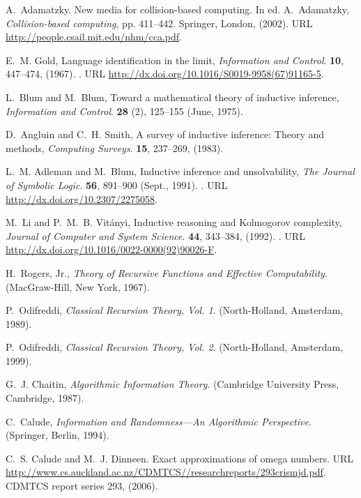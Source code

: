 \documentclass{ws-rv9x6}
\begin{document}
\begin{thebibliography}{25}
A.~Adamatzky.
\newblock New media for collision-based computing.
\newblock In ed. A.~Adamatzky, \emph{Collision-based computing}, pp. 411--442.
  Springer, London,  (2002).
\newblock URL \url{http://people.csail.mit.edu/nhm/cca.pdf}.

E.~M. Gold, Language identification in the limit, \emph{Information and
  Control}. {\bf 10},  447--474,  (1967).
\newblock {}.
\newblock URL \url{http://dx.doi.org/10.1016/S0019-9958(67)91165-5}.

L.~Blum and M.~Blum, Toward a mathematical theory of inductive inference,
  \emph{Information and Control}. {\bf 28} (2),  125--155
  (June, 1975).

D.~Angluin and C.~H. Smith, A survey of inductive inference: Theory and
  methods, \emph{Computing Surveys}. {\bf 15},  237--269,  (1983).

L.~M. Adleman and M.~Blum, Inductive inference and unsolvability, \emph{The
  Journal of Symbolic Logic}. {\bf 56},  891--900 (Sept., 1991).
\newblock {}.
\newblock URL \url{http://dx.doi.org/10.2307/2275058}.

M.~Li and P.~M.~B. Vit{\'{a}}nyi, Inductive reasoning and {K}olmogorov
  complexity, \emph{Journal of Computer and System Science}. {\bf 44},
   343--384,  (1992).
\newblock {}.
\newblock URL \url{http://dx.doi.org/10.1016/0022-0000(92)90026-F}.

H.~{Rogers, Jr.}, \emph{Theory of Recursive Functions and Effective
  Computability}. (MacGraw-Hill, New York, 1967).

P.~Odifreddi, \emph{Classical Recursion Theory, Vol. 1}. (North-Holland,
  Amsterdam, 1989).

P.~Odifreddi, \emph{Classical Recursion Theory, Vol. 2}. (North-Holland,
  Amsterdam, 1999).

G.~J. Chaitin, \emph{Algorithmic Information Theory}. (Cambridge University
  Press, Cambridge, 1987).

C.~Calude, \emph{Information and Randomness---An Algorithmic Perspective}.
  (Springer, Berlin, 1994).

C.~S. Calude and M.~J. Dinneen.
\newblock Exact approximations of omega numbers.
\newblock URL
  \url{http://www.cs.auckland.ac.nz/CDMTCS//researchreports/293crismjd.pdf}.
\newblock CDMTCS report series 293,  (2006).


\end{thebibliography}
\end{document}
